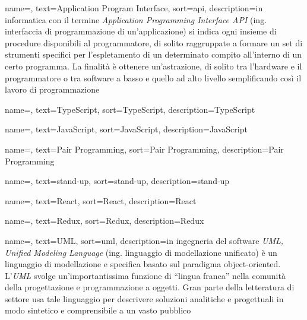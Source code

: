 
\renewcommand{\acronymname}{Acronimi e abbreviazioni}




{
    name=,
    text=Application Program Interface,
    sort=api,
    description={in informatica con il termine \emph{Application Programming Interface API} (ing. interfaccia di programmazione di un'applicazione) si indica ogni insieme di procedure disponibili al programmatore, di solito raggruppate a formare un set di strumenti specifici per l'espletamento di un determinato compito all'interno di un certo programma. La finalità è ottenere un'astrazione, di solito tra l'hardware e il programmatore o tra software a basso e quello ad alto livello semplificando così il lavoro di programmazione}
}

{
    name=,
    text=TypeScript,
    sort=TypeScript,
    description={TypeScript}
}

{
    name=,
    text=JavaScript,
    sort=JavaScript,
    description={JavaScript}
}

{
    name=,
    text=Pair Programming,
    sort=Pair Programming,
    description={Pair Programming}
}

{
    name=,
    text=stand-up,
    sort=stand-up,
    description={stand-up}
}

{
    name=,
    text=React,
    sort=React,
    description={React}
}

{
    name=,
    text=Redux,
    sort=Redux,
    description={Redux}
}

{
    name=,
    text=UML,
    sort=uml,
    description={in ingegneria del software \emph{UML, Unified Modeling Language} (ing. linguaggio di modellazione unificato) è un linguaggio di modellazione e specifica basato sul paradigma object-oriented. L'\emph{UML} svolge un'importantissima funzione di ``lingua franca'' nella comunità della progettazione e programmazione a oggetti. Gran parte della letteratura di settore usa tale linguaggio per descrivere soluzioni analitiche e progettuali in modo sintetico e comprensibile a un vasto pubblico}
}
